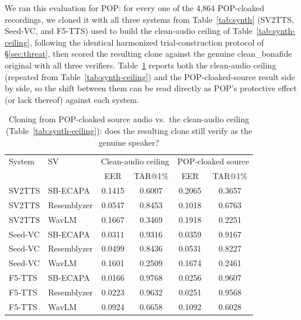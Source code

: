 \documentclass[11pt]{article}
\begin{document}
We ran this evaluation for POP: for every one of the 4,864
POP-cloaked recordings, we cloned it with all three systems from
Table~\ref{tab:synth} (SV2TTS, Seed-VC, and F5-TTS) used to build the
clean-audio ceiling of Table~\ref{tab:synth-ceiling}, following the
identical harmonized trial-construction protocol of
\S\ref{sec:threat}, then scored the resulting clone against the
genuine clean\_bonafide original with all three verifiers.
Table~\ref{tab:protective-efficacy} reports both the clean-audio
ceiling (repeated from Table~\ref{tab:synth-ceiling}) and the
POP-cloaked-source result side by side, so the shift between them can
be read directly as POP's protective effect (or lack thereof) against
each system.

\begin{table}[H]
\centering
\caption{Cloning from POP-cloaked source audio vs.\ the clean-audio
ceiling (Table~\ref{tab:synth-ceiling}): does the resulting clone
still verify as the genuine speaker?}
\label{tab:protective-efficacy}
\begin{tabular}{llcccc}
\toprule
System & SV & \multicolumn{2}{c}{Clean-audio ceiling} & \multicolumn{2}{c}{POP-cloaked source} \\
       &    & EER & TAR@1\% & EER & TAR@1\% \\
\midrule
SV2TTS   & SB-ECAPA    & 0.1415 & 0.6007 & 0.2065 & 0.3657 \\
SV2TTS   & Resemblyzer & 0.0547 & 0.8453 & 0.1018 & 0.6763 \\
SV2TTS   & WavLM       & 0.1667 & 0.3469 & 0.1918 & 0.2251 \\
\addlinespace
Seed-VC  & SB-ECAPA    & 0.0311 & 0.9316 & 0.0359 & 0.9167 \\
Seed-VC  & Resemblyzer & 0.0499 & 0.8436 & 0.0531 & 0.8227 \\
Seed-VC  & WavLM       & 0.1601 & 0.2509 & 0.1674 & 0.2461 \\
\addlinespace
F5-TTS   & SB-ECAPA    & 0.0166 & 0.9768 & 0.0256 & 0.9607 \\
F5-TTS   & Resemblyzer & 0.0223 & 0.9632 & 0.0251 & 0.9568 \\
F5-TTS   & WavLM       & 0.0924 & 0.6658 & 0.1092 & 0.6028 \\
\bottomrule
\end{tabular}
\end{table}
\end{document}

